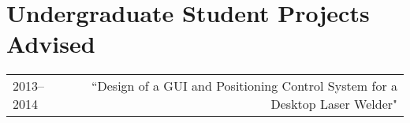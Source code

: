 
\section*{Undergraduate Student Projects Advised}
\begin{tabular}{L!{\VRule}R}
2013--2014&``Design of a GUI and Positioning Control System for a Desktop Laser Welder"\\
\end{tabular}